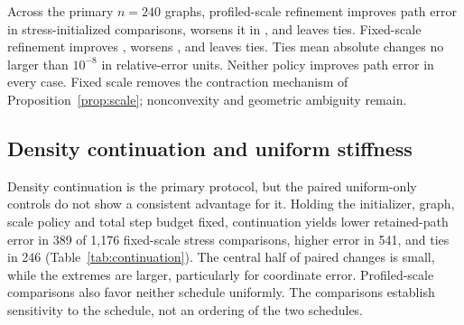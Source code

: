 \documentclass[11pt]{article}
\begin{document}
Across the \numPrimaryGraphs{} primary $n=240$ graphs, profiled-scale refinement improves
path error in \numProfiledImproved{} stress-initialized comparisons, worsens it in \numProfiledWorsened{}, and
leaves \numProfiledTied{} ties. Fixed-scale refinement improves \numFixedImproved{}, worsens \numFixedWorsened{}, and leaves
\numFixedTied{} ties. Ties mean absolute changes no larger than $10^{-8}$ in relative-error
units. Neither policy improves path error in every case. Fixed scale removes the contraction mechanism of Proposition~\ref{prop:scale};
nonconvexity and geometric ambiguity remain.

\subsection{Density continuation and uniform stiffness}
Density continuation is the primary protocol, but the paired uniform-only
controls do not show a consistent advantage for it. Holding the initializer,
graph, scale policy and total step budget fixed, continuation yields lower
retained-path error in 389 of 1,176 fixed-scale stress comparisons, higher error
in 541, and ties in 246 (Table~\ref{tab:continuation}). The central half of paired
changes is small, while the extremes are larger, particularly for coordinate
error. Profiled-scale comparisons also favor neither schedule uniformly.
The comparisons establish sensitivity to the schedule, not an ordering of
the two schedules.

\begin{table}[htbp]\centering\small
\caption{Density continuation minus uniform-only error for paired stress-initialized
radius-study fits, with 1,176 primary $n=240$ graphs per scale policy. Negative
changes favor continuation. Counts use an absolute tie tolerance of $10^{-8}$
in relative-error units; intervals and medians are in percentage points (pp).
The pairs share graphs and samples and are not independent trials.}\label{tab:continuation}

\end{table}
\end{document}
